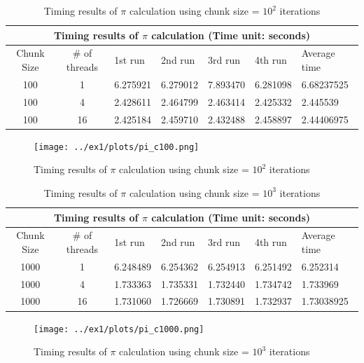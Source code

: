 \documentclass{article}
\begin{document}

\begin{table}[htbp]
  \centering
    \begin{tabular}{|c c||l l l l| l|} 
    \hline
    \multicolumn{7}{|c|}{Timing results of $\pi$ calculation (Time unit: seconds)} \\
    \hline
    Chunk Size & \# of threads & 1st run & 2nd run & 3rd run & 4th run & Average time\\ [0.5ex] 
    \hline\hline
    100 & 1 & 6.275921 & 6.279012 & 7.893470 & 6.281098 & 6.68237525 \\
    \hline
    100 & 4 & 2.428611 & 2.464799 & 2.463414 & 2.425332 & 2.445539 \\
    \hline
    100 & 16 & 2.425184 & 2.459710 & 2.432488 & 2.458897 & 2.44406975 \\ [1ex]
    \hline
    \end{tabular}
  \caption{Timing results of $\pi$ calculation using chunk size = $10^2$ iterations}
\end{table}

\begin{figure}[htbp]
  \centering
  \texttt{[image: ../ex1/plots/pi\_c100.png]}
  \caption{Timing results of $\pi$ calculation using chunk size = $10^2$ iterations}
\end{figure}


\begin{table}[htbp]
  \centering
    \begin{tabular}{|c c||l l l l| l|} 
    \hline
    \multicolumn{7}{|c|}{Timing results of $\pi$ calculation (Time unit: seconds)} \\
    \hline
    Chunk Size & \# of threads & 1st run & 2nd run & 3rd run & 4th run & Average time\\ [0.5ex] 
    \hline\hline
    1000 & 1 & 6.248489 & 6.254362 & 6.254913 & 6.251492 & 6.252314 \\
    \hline
    1000 & 4 & 1.733363 & 1.735331 & 1.732440 & 1.734742 & 1.733969 \\
    \hline
    1000 & 16 & 1.731060 & 1.726669 & 1.730891 & 1.732937 & 1.73038925 \\ [1ex]
    \hline
    \end{tabular}
  \caption{Timing results of $\pi$ calculation using chunk size = $10^3$ iterations}
\end{table}

\begin{figure}[htbp]
  \centering
  \texttt{[image: ../ex1/plots/pi\_c1000.png]}
  \caption{Timing results of $\pi$ calculation using chunk size = $10^3$ iterations}
\end{figure}
\end{document}
